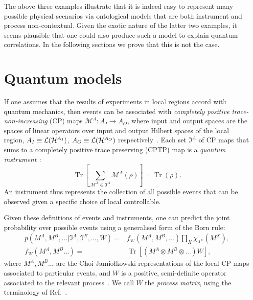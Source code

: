 \documentclass[a4paper,onecolumn,11pt,accepted=2018-05-04]{quantumarticle}
\DeclareMathOperator{\tr}{Tr}
\newcommand{\lin}{{\cal L}}
\begin{document}
The above three examples illustrate that it is indeed easy to represent many possible physical scenarios via ontological models that are both instrument and process non-contextual. Given the exotic nature of the latter two examples, it seems plausible that one could also produce such a model to explain quantum correlations. In the following sections we prove that this is not the case.



\section{Quantum models}\label{quantModel}

If one assumes that the results of experiments in local regions accord with quantum mechanics, then events can be associated with \emph{completely positive trace-non-increasing} (CP) maps $\mathcal{M}^A :A_I\rightarrow A_O$, where input and output spaces are the spaces of linear operators over input and output Hilbert spaces of the local region, $A_I\equiv\lin({\cal H}^{A_I})$, $A_O\equiv \lin({\cal H}^{A_O})$ respectively~\cite{chuang00}. Each set ${\mathfrak I}^A$ of  CP maps that sums to a completely positive trace preserving (CPTP) map is a \emph{quantum instrument}~\cite{davies70}:
\begin{equation}
\tr \left[ \sum_{\mathcal{M}^A\in {\mathfrak I}^A} \mathcal{M}^A(\rho)\right] =  \tr(\rho).
\label{instrument}
\end{equation}
An instrument thus represents the collection of all possible events that can be observed given a specific choice of local controllable.
%



Given these definitions of events and instruments, one can predict the joint probability over possible events using a generalised form of the Born rule:
\begin{align}
p(M^A, M^B,\dots|\mathfrak{I}^A, \mathfrak{I}^B,\dots, W)  =&f_W(M^A, M^B,\dots)
\prod_{X}  \chi_{\mathfrak{I}^X}(M^X),\\ \label{born}
f_W(M^A, M^B\dots) =& \tr \left[(M^A \otimes M^B \otimes\dots) W\right],
\end{align}
where $M^A, M^B\dots$ are the Choi-Jamio{\l}kowski representations of the local CP maps associated to particular events, and $W$ is a positive, semi-definite operator associated to the relevant process~\cite{gutoski06, chiribella09b, oreshkov12}. We call $W$ the \emph{process matrix}, using the terminology of Ref.~\cite{oreshkov12}.
\end{document}
